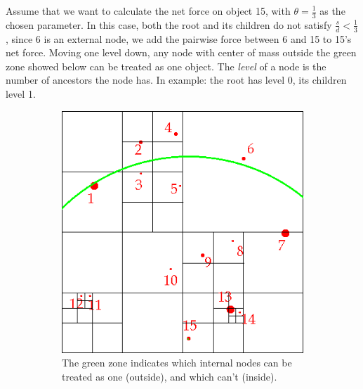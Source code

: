 Assume that we want to calculate the net force on object 15, with $\theta = \frac{1}{3}$ as the chosen parameter. In this case, both the root and its children do not satisfy $\frac{s}{d} < \frac{1}{3}$, since 6 is an external node, we add the pairwise force between 6 and 15 to 15's net force. Moving one level down, any node with center of mass outside the green zone showed below can be treated as one object. The \textit{level} of a node is the number of ancestors the node has. In example: the root has level 0, its children level 1.
\begin{figure}[H]
\centering
\begin{subfigure}{0.24\textwidth}
\includegraphics[width=\textwidth]{barneshut_map_green_2.png}
\caption{The green zone indicates which internal nodes can be treated as one (outside), and which can't (inside).}
\end{subfigure}\hspace{1cm}
\begin{subfigure}{0.24\textwidth}

\end{subfigure}
\end{figure}
